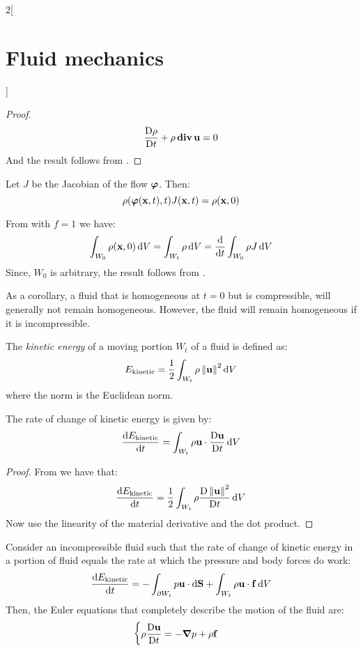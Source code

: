 \documentclass[../../../main_physics.tex]{subfiles}
\begin{document}
\begin{multicols}{2}[\section{Fluid mechanics}]
\begin{proof}
$$      \matdv{\rho}{t}+\rho\div\vf{u}=0
    $$
    And the result follows from .
  \end{proof}
  \begin{proposition}
    Let $J$ be the Jacobian of the flow $\vf\varphi$. Then:
    $$
      \rho(\vf\varphi(\vf{x},t),t)J(\vf{x},t)=\rho(\vf{x},0)
    $$
  \end{proposition}
  \begin{sproof}
    From  with $f=1$ we have:
    $$
      \int_{W_0}\rho(\vf{x},0)\dd{V}=\int_{W_t}\rho\dd{V}=\dv{}{t}\int_{W_0}\rho J\dd{V}
    $$
    Since, $W_0$ is arbitrary, the result follows from .
  \end{sproof}
  \begin{remark}
    As a corollary, a fluid that is homogeneous at $t = 0$ but is compressible, will generally not remain homogeneous. However, the fluid will remain homogeneous if it is incompressible.
  \end{remark}
  \begin{definition}
    The \emph{kinetic energy} of a moving portion $W_t$ of a fluid is defined as:
    $$
      E_\mathrm{kinetic}= \frac{1}{2}\int_{W_t}\rho\norm{\vf{u}}^2\dd{V}
    $$
    where the norm is the Euclidean norm.
  \end{definition}
  \begin{lemma}\label{FLM:lemmaEkinetic}
    The rate of change of kinetic energy is given by:
    $$
      \dv{E_\mathrm{kinetic}}{t}=\int_{W_t}\rho\vf{u}\cdot\matdv{\vf{u}}{t}\dd{V}
    $$
  \end{lemma}
  \begin{proof}
    From  we have that:
    $$
      \dv{E_\mathrm{kinetic}}{t}= \frac{1}{2}\int_{W_t}\rho\matdv{\norm{\vf{u}}^2}{t}\dd{V}
    $$
    Now use the linearity of the material derivative and the dot product.
  \end{proof}
  \begin{theorem}
    Consider an incompressible fluid such that the rate of change of kinetic energy in a portion of fluid equals the rate at which the pressure and body forces do work:
    $$
      \dv{E_\mathrm{kinetic}}{t}=-\int_{\partial W_t}p\vf{u}\cdot\dd{\vf{S}}+\int_{W_t}\rho\vf{u}\cdot\vf{f}\dd{V}
    $$
    Then, the Euler equations that completely describe the motion of the fluid are:
    $$
      \begin{cases}
        \displaystyle\rho \matdv{\vf{u}}{t}= -\grad p + \rho\vf{f} \\

\end{cases}$$
\end{theorem}
\end{multicols}
\end{document}
